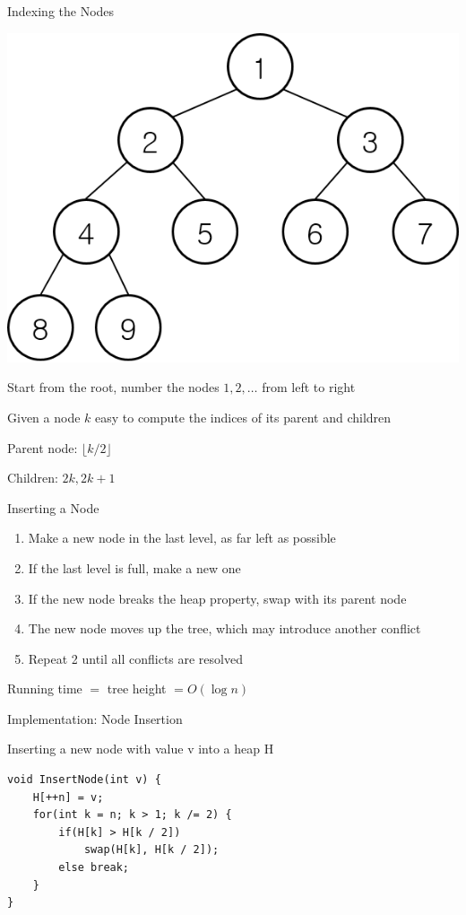 \documentclass[13pt,onlymath]{beamer}
\begin{document}
\begin{frame}{Indexing the Nodes}
\begin{center}
\includegraphics[height=0.4\textheight]{figures/heap_index.png}
\end{center}
\BIT
\item Start from the root, number the nodes $1, 2, \ldots$ from left to right
\item Given a node $k$ easy to compute the indices of its parent and children
\BIT
\item Parent node: $\lfloor k/2 \rfloor$
\item Children: $2k, 2k+1$
\EIT
\EIT
\end{frame}

\begin{frame}{Inserting a Node}
\begin{enumerate}
\item Make a new node in the last level, as far left as possible
\BIT
\item If the last level is full, make a new one
\EIT
\item If the new node breaks the heap property, swap with its parent node
\BIT
\item The new node moves up the tree, which may introduce another conflict
\EIT
\item Repeat 2 until all conflicts are resolved
\end{enumerate}
\BIT
\item Running time $=$ tree height $= O(\log n)$
\EIT
\end{frame}

\begin{frame}[fragile]{Implementation: Node Insertion}
\BIT
\item Inserting a new node with value v into a heap H
\EIT
\begin{Verbatim}[xleftmargin=25pt]
void InsertNode(int v) {
    H[++n] = v;
    for(int k = n; k > 1; k /= 2) {
        if(H[k] > H[k / 2])
            swap(H[k], H[k / 2]);
        else break;
    }
}
\end{Verbatim}
\end{frame}
\end{document}
